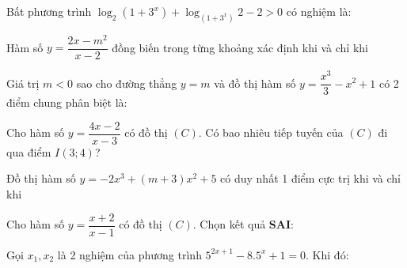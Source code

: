\documentclass[12pt]{article}
\begin{document}
\begin{vnmultiplechoice}[keycolumns=3]
\begin{question}%
Bất phương trình $\log_2\left(1+3^x\right)+\log_{\left(1+3^x\right)}2-2>0$ có nghiệm là:
\datcot
\bonpa
{}
{}
{}
{}
\end{question}

\begin{question}%
Hàm số $y=\dfrac{2x-m^2}{x-2}$ đồng biến trong từng khoảng xác định khi và chỉ khi
\datcot
\bonpa
{}
{}
{}
{}
\end{question}

\begin{question}%
Giá trị $m<0$ sao cho đường thẳng $y=m$ và đồ thị hàm số $y=\dfrac{x^3}{3}-x^2+1$ có 2 điểm chung phân biệt là:
\datcot
\bonpa
{}
{}
{}
{}
\end{question}

\begin{question}%
Cho hàm số $y=\dfrac{4x-2}{x-3}$ có đồ thị $(C)$. Có bao nhiêu tiếp tuyến của $(C)$ đi qua điểm $I(3;4)$?
\vspace{0.2cm}
\datcot
\bonpa
{}
{}
{}
{}
\end{question}

\begin{question}%
Đồ thị hàm số $y=-2x^3+(m+3)x^2+5$ có duy nhất 1 điểm cực trị khi và chỉ khi
\vspace{0.2cm}
\datcot
\bonpa
{}
{}
{}
{}
\end{question}

\begin{question}%
Cho hàm số $y=\dfrac{x+2}{x-1}$ có đồ thị $(C)$. Chọn kết quả \textbf{SAI}:
\vspace{0.2cm}
\datcot[4]
\bonpa
{}
{}
{}
{}
\end{question}

\begin{question}%
Gọi $x_1, x_2$ là 2 nghiệm của phương trình $5^{2x+1}-8.5^x+1=0$. Khi đó:
\vspace{0.2cm}
\datcot
\bonpa
{}
{}
{}
{}
\end{question}


\end{vnmultiplechoice}
\end{document}
